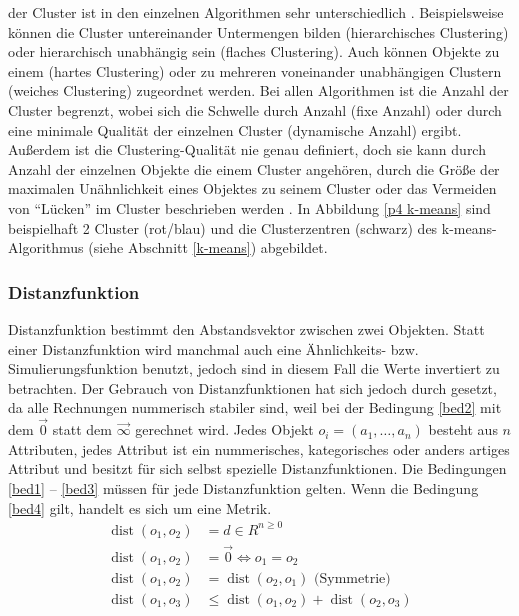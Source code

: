\documentclass[12pt,journal,compsoc]{IEEEtran}
\DeclareMathOperator{\dist}{dist}
\begin{document}
 der Cluster ist in den einzelnen Algorithmen sehr unterschiedlich \cite{ester2000knowledge}. Beispielsweise können die Cluster untereinander Untermengen bilden (hierarchisches Clustering) oder hierarchisch unabhängig sein (flaches Clustering). Auch können Objekte zu einem (hartes Clustering) oder zu mehreren voneinander unabhängigen Clustern (weiches Clustering) zugeordnet werden. Bei allen Algorithmen ist die Anzahl der Cluster begrenzt, wobei sich die Schwelle durch Anzahl (fixe Anzahl) oder durch eine minimale Qualität der einzelnen Cluster (dynamische Anzahl) ergibt. Außerdem ist die Clustering-Qualität nie genau definiert, doch sie kann durch Anzahl der einzelnen Objekte die einem Cluster angehören, durch die Größe der maximalen Unähnlichkeit eines Objektes zu seinem Cluster oder das Vermeiden von \enquote{Lücken} im Cluster beschrieben werden \cite{dwh}. In Abbildung \ref{p4 k-means} sind beispielhaft 2 Cluster (rot/blau) und die Clusterzentren (schwarz) des k-means-Algorithmus (siehe Abschnitt \ref{k-means}) abgebildet.

\subsubsection{Distanzfunktion} \label{distanzfunktion}
 Distanzfunktion bestimmt den Abstandsvektor zwischen zwei Objekten. Statt einer Distanzfunktion
wird manchmal auch eine Ähnlichkeits- bzw. Simulierungsfunktion benutzt, jedoch sind in diesem
Fall die Werte invertiert zu betrachten. Der Gebrauch von Distanzfunktionen hat sich jedoch durch
gesetzt, da alle Rechnungen nummerisch stabiler sind, weil bei der Bedingung \ref{bed2} mit dem $\vec{0}$ 
statt dem $\vec{\infty}$ gerechnet wird. Jedes Objekt $o_i = (a_1, \ldots, a_n)$ besteht aus $n$ Attributen, jedes 
Attribut ist ein nummerisches, kategorisches oder anders artiges Attribut und besitzt für sich selbst 
spezielle Distanzfunktionen. Die Bedingungen \ref{bed1} -- \ref{bed3} müssen für jede 
Distanzfunktion gelten. Wenn die Bedingung \ref{bed4} gilt, handelt es sich um eine Metrik.
\begin{align}
\dist(o_1, o_2) &= d \in R^{n\geq 0} \label{bed1}\\
\dist(o_1, o_2) &= \vec{0} \Leftrightarrow o_1 = o_2 \label{bed2}\\
\dist(o_1, o_2) &= \dist(o_2, o_1) \mbox{ (Symmetrie)} \label{bed3}\\
\dist(o_1, o_3) &\leq \dist(o_1, o_2) + \dist(o_2, o_3) \label{bed4}
\end{align} 
\end{document}
